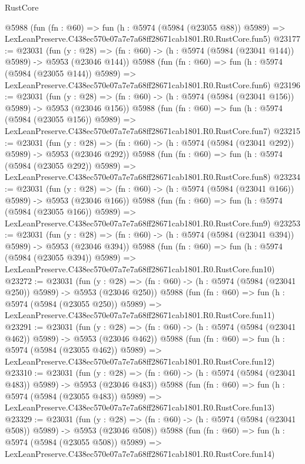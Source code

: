 \begin{lexlean}{RustCore}
\begin{coremodule}
    @5988
    (fun (fn : @60) =>
    fun (h : @5974 (@5984 (@23055 @88)) @5989) =>
    LexLeanPreserve.C438ec570e07a7e7a68ff28671cab1801.R0.RustCore.fun5)
@23177 := @23031
    (fun (y : @28) => (fn : @60) -> (h : @5974 (@5984 (@23041 @144)) @5989) -> @5953 (@23046 @144))
    @5988
    (fun (fn : @60) =>
    fun (h : @5974 (@5984 (@23055 @144)) @5989) =>
    LexLeanPreserve.C438ec570e07a7e7a68ff28671cab1801.R0.RustCore.fun6)
@23196 := @23031
    (fun (y : @28) => (fn : @60) -> (h : @5974 (@5984 (@23041 @156)) @5989) -> @5953 (@23046 @156))
    @5988
    (fun (fn : @60) =>
    fun (h : @5974 (@5984 (@23055 @156)) @5989) =>
    LexLeanPreserve.C438ec570e07a7e7a68ff28671cab1801.R0.RustCore.fun7)
@23215 := @23031
    (fun (y : @28) => (fn : @60) -> (h : @5974 (@5984 (@23041 @292)) @5989) -> @5953 (@23046 @292))
    @5988
    (fun (fn : @60) =>
    fun (h : @5974 (@5984 (@23055 @292)) @5989) =>
    LexLeanPreserve.C438ec570e07a7e7a68ff28671cab1801.R0.RustCore.fun8)
@23234 := @23031
    (fun (y : @28) => (fn : @60) -> (h : @5974 (@5984 (@23041 @166)) @5989) -> @5953 (@23046 @166))
    @5988
    (fun (fn : @60) =>
    fun (h : @5974 (@5984 (@23055 @166)) @5989) =>
    LexLeanPreserve.C438ec570e07a7e7a68ff28671cab1801.R0.RustCore.fun9)
@23253 := @23031
    (fun (y : @28) => (fn : @60) -> (h : @5974 (@5984 (@23041 @394)) @5989) -> @5953 (@23046 @394))
    @5988
    (fun (fn : @60) =>
    fun (h : @5974 (@5984 (@23055 @394)) @5989) =>
    LexLeanPreserve.C438ec570e07a7e7a68ff28671cab1801.R0.RustCore.fun10)
@23272 := @23031
    (fun (y : @28) => (fn : @60) -> (h : @5974 (@5984 (@23041 @250)) @5989) -> @5953 (@23046 @250))
    @5988
    (fun (fn : @60) =>
    fun (h : @5974 (@5984 (@23055 @250)) @5989) =>
    LexLeanPreserve.C438ec570e07a7e7a68ff28671cab1801.R0.RustCore.fun11)
@23291 := @23031
    (fun (y : @28) => (fn : @60) -> (h : @5974 (@5984 (@23041 @462)) @5989) -> @5953 (@23046 @462))
    @5988
    (fun (fn : @60) =>
    fun (h : @5974 (@5984 (@23055 @462)) @5989) =>
    LexLeanPreserve.C438ec570e07a7e7a68ff28671cab1801.R0.RustCore.fun12)
@23310 := @23031
    (fun (y : @28) => (fn : @60) -> (h : @5974 (@5984 (@23041 @483)) @5989) -> @5953 (@23046 @483))
    @5988
    (fun (fn : @60) =>
    fun (h : @5974 (@5984 (@23055 @483)) @5989) =>
    LexLeanPreserve.C438ec570e07a7e7a68ff28671cab1801.R0.RustCore.fun13)
@23329 := @23031
    (fun (y : @28) => (fn : @60) -> (h : @5974 (@5984 (@23041 @508)) @5989) -> @5953 (@23046 @508))
    @5988
    (fun (fn : @60) =>
    fun (h : @5974 (@5984 (@23055 @508)) @5989) =>
    LexLeanPreserve.C438ec570e07a7e7a68ff28671cab1801.R0.RustCore.fun14)

\end{coremodule}
\end{lexlean}
